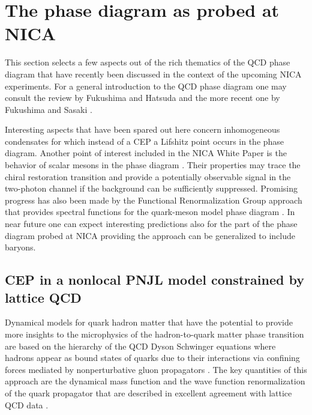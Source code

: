 \documentclass{webofc}
\begin{document}
\section{The phase diagram as probed at NICA}
\label{sec-1}
This section selects  a few aspects out of the rich thematics of the QCD phase diagram that have recently been discussed in the context of the upcoming NICA experiments. 
For a general introduction to the QCD phase diagram one may consult the review by Fukushima and Hatsuda \cite{Fukushima:2010bq} and the more recent one by Fukushima and Sasaki
\cite{Fukushima:2013rx}.

Interesting aspects that have been spared out here concern inhomogeneous condensates \cite{Buballa:2014tba} for which instead of a CEP a Lifshitz point occurs in  the phase diagram. 
Another point of interest included in the NICA White Paper is the behavior of scalar mesons in the phase diagram  \cite{Costa:2016wkj}. Their properties may trace the chiral restoration transition and provide a potentially observable signal in the two-photon channel \cite{Volkov:1997dx} if the background can be sufficiently suppressed.
Promising progress has also been made by the Functional Renormalization Group approach that provides spectral functions for the quark-meson model phase diagram \cite{Tripolt:2013jra}. In near future one can expect interesting predictions also for the part of the phase diagram probed at NICA providing the approach can be generalized to include baryons.

\subsection{CEP in a nonlocal PNJL model constrained by lattice QCD}
\label{sec-2}

Dynamical models for quark hadron matter that have the potential to provide more insights to the microphysics of the hadron-to-quark matter phase transition are based on the hierarchy of the QCD Dyson Schwinger equations where hadrons appear as bound states of quarks due to their interactions via confining forces mediated by nonperturbative gluon propagators \cite{Gao:2015kea,Roberts:2015lja,Cloet:2013jya}. The key quantities of this approach are the dynamical mass function and the wave function renormalization of the quark propagator that are described in excellent agreement with lattice QCD data
\cite{Bowman:2005vx,Parappilly:2005ei}.
\end{document}
